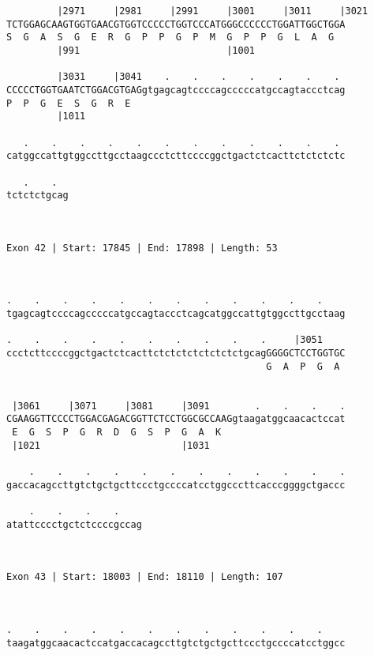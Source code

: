 \documentclass{article}
\begin{document}
\begin{Verbatim}
         |2971     |2981     |2991     |3001     |3011     |3021
TCTGGAGCAAGTGGTGAACGTGGTCCCCCTGGTCCCATGGGCCCCCCTGGATTGGCTGGA
S  G  A  S  G  E  R  G  P  P  G  P  M  G  P  P  G  L  A  G  
         |991                          |1001                
  
         |3031     |3041    .    .    .    .    .    .    . 
CCCCCTGGTGAATCTGGACGTGAGgtgagcagtccccagcccccatgccagtaccctcag
P  P  G  E  S  G  R  E                                      
         |1011                                              
  
   .    .    .    .    .    .    .    .    .    .    .    . 
catggccattgtggccttgcctaagccctcttccccggctgactctcacttctctctctc
                                                            
   .    .  
tctctctgcag
           
           
 
Exon 42 | Start: 17845 | End: 17898 | Length: 53



.    .    .    .    .    .    .    .    .    .    .    .    
tgagcagtccccagcccccatgccagtaccctcagcatggccattgtggccttgcctaag
                                                            
.    .    .    .    .    .    .    .    .    .     |3051    
ccctcttccccggctgactctcacttctctctctctctctctgcagGGGGCTCCTGGTGC
                                              G  A  P  G  A 
                                                            
  
 |3061     |3071     |3081     |3091        .    .    .    .
CGAAGGTTCCCCTGGACGAGACGGTTCTCCTGGCGCCAAGgtaagatggcaacactccat
 E  G  S  P  G  R  D  G  S  P  G  A  K                      
 |1021                         |1031                        
  
    .    .    .    .    .    .    .    .    .    .    .    .
gaccacagccttgtctgctgcttccctgccccatcctggcccttcacccggggctgaccc
                                                            
    .    .    .    .    
atattcccctgctctccccgccag
                        
                        
 
Exon 43 | Start: 18003 | End: 18110 | Length: 107



.    .    .    .    .    .    .    .    .    .    .    .    
taagatggcaacactccatgaccacagccttgtctgctgcttccctgccccatcctggcc
                                                            

\end{Verbatim}
\end{document}
